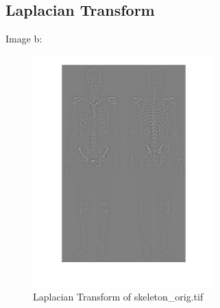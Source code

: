 \documentclass[11pt,oneside]{book}
\begin{document}
\subsection{Laplacian Transform}
Image b:
\begin{figure}[!htb]
   \centering  
   \includegraphics[width=0.625\textwidth]{images/2/b.jpg}
   \caption{Laplacian Transform of skeleton\_orig.tif}  
\end{figure}
\end{document}
